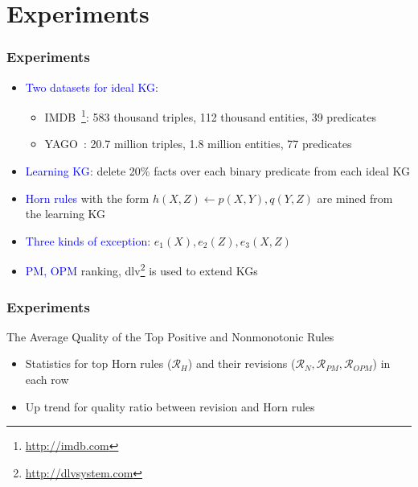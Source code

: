 \documentclass{beamer}
\newcommand{\bl}[1]{\textcolor{blue}{#1}}
\def\cR{\ensuremath{\mathcal{R}}}
\newcommand{\mi}[1]{\ensuremath{\mathit{#1}}}
\begin{document}
\section{Experiments}
\begin{frame}\frametitle{Experiments}
\begin{itemize}
\item \bl{Two datasets for ideal KG}:
\begin{itemize}
\item IMDB~\footnote{\url{http://imdb.com}}: 583 thousand triples, 112 thousand entities, 39 predicates
\item YAGO~\cite{yago3}: 20.7 million triples, 1.8 million entities, 77 predicates
\end{itemize}

\medskip

\item \bl{Learning KG}: delete 20\% facts over each binary predicate from each ideal KG
\medskip

\item \bl{Horn rules} with the form $\mi{h(X,Z)\leftarrow p(X,Y),q(Y,Z)}$ are mined from the learning KG
\medskip

\item \bl{Three kinds of exception}: $\mi{e_1(X),e_2(Z),e_3(X,Z)}$
\medskip

\item \bl{PM, OPM} ranking, dlv\footnote{\url{http://dlvsystem.com}} is used to extend KGs
\end{itemize}

\end{frame}

\begin{frame}\frametitle{Experiments}

\begin{table}[ht]
\centering
\footnotesize
\renewcommand*{\arraystretch}{1.07}
\centering

\caption{The Average Quality of the Top Positive and Nonmonotonic Rules}
\label{tab:rules_quality}
\end{table}

\begin{itemize}
\item Statistics for top Horn rules ($\cR_H$) and their revisions ($\cR_N, \cR_{PM}, \cR_{OPM}$) in each row
\item Up trend for quality ratio between revision and Horn rules
\end{itemize}

\end{frame}
\end{document}
